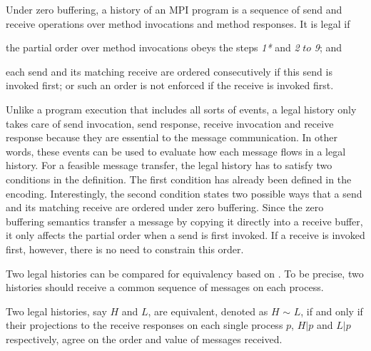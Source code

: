 \begin{definition}
Under zero buffering, a history of an MPI program is a sequence of send and receive operations over method invocations and method responses. It is legal if
\begin{compactenum}
\item the partial order over method invocations obeys the steps \textit{1*} and \textit{2} $to$ \textit{9}; and 
\item each send and its matching receive are ordered consecutively if this send is invoked first; or such an order is not enforced if the receive is invoked first.
\end{compactenum}
\end{definition}

Unlike a program execution that includes all sorts of events, a legal history only takes care of send invocation, send response, receive invocation and receive response because they are essential to the message communication. In other words, these events can be used to evaluate how each message flows in a legal history. For a feasible message transfer, the legal history has to satisfy two conditions in the definition. The first condition has already been defined in the encoding. Interestingly, the second condition states two possible ways that a send and its matching receive are ordered under zero buffering. Since the zero buffering semantics transfer a message by copying it directly into a receive buffer, it only affects the partial order when a send is first invoked. If a receive is invoked first, however, there is no need to constrain this order. 


Two legal histories can be compared for equivalency based on . To be precise, two histories should receive a common sequence of messages on each process. 

\begin{definition}\label{def:er}
Two legal histories, say $H$ and $L$, are equivalent, denoted as $H$ $\sim$ $L$, if and only if their projections to the receive responses on each single process $p$, $H | p$ and $L | p$ respectively, agree on the order and value of messages received.
\end{definition}

